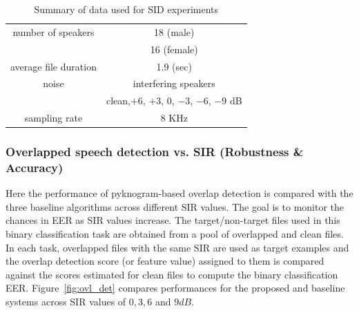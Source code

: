 {\begin{table}[h!]
	\begin{center}
		\label{tab:data_summary}
		\begin{tabular}{| c | c |}
			\hline
			\hline
			number of speakers	& 18 (male)  \\
			\hspace{4mm}			&  16 (female) \\
			\hline
			average file duration	&   1.9 (sec) \\ 
			\hline
			noise				& interfering speakers \\
			\hspace{4mm}			& clean,$+6$, $+3$, $0$, $-3$, $-6$, $-9$ dB \\
			\hline
			sampling rate			& $8$ KHz \\
			\hline
			\hline	
		\end{tabular}
		\caption{Summary of data used for SID experiments}
	\end{center}
\end{table}


\vspace{3mm}
\subsubsection{Overlapped speech detection vs. SIR (Robustness \& Accuracy)}
Here the performance of pyknogram-based overlap detection is compared with the three baseline algorithms across different SIR values. 
The goal is to monitor the chances in EER as SIR values increase. 
The target/non-target files used in this binary classification task are obtained from a pool of overlapped and clean files. 
In each task, overlapped files with the same SIR are used as target examples and the overlap detection score (or feature value) assigned to them is compared against the scores estimated for clean files to compute the binary classification EER. 
Figure~\ref{fig:ovl_det} compares performances for the proposed and baseline systems across SIR values of $0, 3, 6$ and $9dB$.

}
